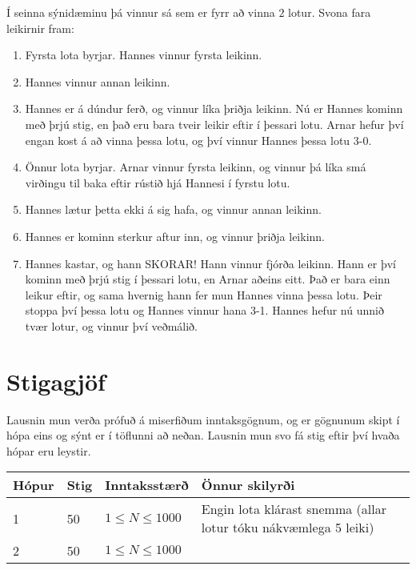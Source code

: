 \noindent
Í seinna sýnidæminu þá vinnur sá sem er fyrr að vinna $2$ lotur. Svona fara leikirnir fram:
\begin{enumerate}
    \item Fyrsta lota byrjar. Hannes vinnur fyrsta leikinn.
    \item Hannes vinnur annan leikinn.
    \item Hannes er á dúndur ferð, og vinnur líka þriðja leikinn. Nú er Hannes kominn með þrjú stig, en það eru bara tveir leikir eftir í þessari lotu. Arnar hefur því engan kost á að vinna þessa lotu, og því vinnur Hannes þessa lotu 3-0.
    \item Önnur lota byrjar. Arnar vinnur fyrsta leikinn, og vinnur þá líka smá virðingu til baka eftir rústið hjá Hannesi í fyrstu lotu.
    \item Hannes lætur þetta ekki á sig hafa, og vinnur annan leikinn.
    \item Hannes er kominn sterkur aftur inn, og vinnur þriðja leikinn.
    \item Hannes kastar, og hann SKORAR! Hann vinnur fjórða leikinn. Hann er
        því kominn með þrjú stig í þessari lotu, en Arnar aðeins eitt. Það er
        bara einn leikur eftir, og sama hvernig hann fer mun Hannes vinna þessa
        lotu. Þeir stoppa því þessa lotu og Hannes vinnur hana 3-1. Hannes hefur nú unnið tvær lotur, og vinnur því veðmálið.
\end{enumerate}

\section*{Stigagjöf}
Lausnin mun verða prófuð á miserfiðum inntaksgögnum, og er gögnunum skipt í
hópa eins og sýnt er í töflunni að neðan. Lausnin mun svo fá stig eftir því
hvaða hópar eru leystir.

\begin{tabular}{|l|l|l|l|}
\hline
Hópur & Stig & Inntaksstærð & Önnur skilyrði  \\ \hline
1     & 50         & $ 1 \le N \le 1000$ & Engin lota klárast snemma (allar lotur tóku nákvæmlega 5 leiki)\\ \hline
2     & 50         & $ 1 \le N \le 1000$ & \\ \hline
\end{tabular}

